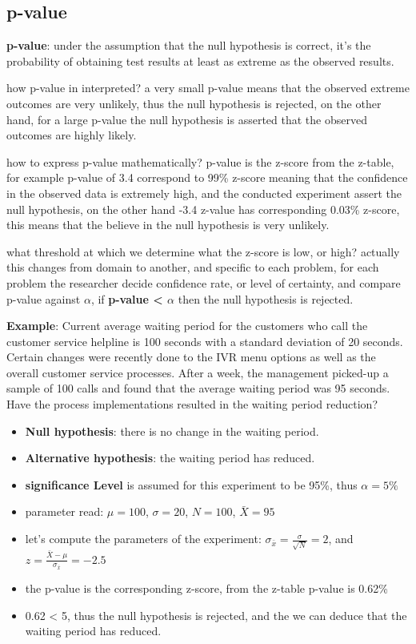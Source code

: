\documentclass[4apaper,12pt]{book}
\begin{document}
\begin{description}
\begin{description}
      \subsection{p-value}
    \item \textbf{p-value}: under the assumption that the null hypothesis is correct, it's the probability of obtaining test results at least as extreme as the observed results.
    \item how p-value in interpreted? a very small p-value means that the observed extreme outcomes are very unlikely, thus the null hypothesis is rejected, on the other hand, for a large p-value the null hypothesis is asserted that the observed outcomes are highly likely.
    \item how to express p-value mathematically? p-value is the z-score from the z-table, for example p-value of 3.4 correspond to 99\% z-score meaning that the confidence in the observed data is extremely high, and the conducted experiment assert the null hypothesis, on the other hand -3.4 z-value has corresponding 0.03\% z-score, this means that the believe in the null hypothesis is very unlikely.
    \item what threshold at which we determine what the z-score is low, or high? actually this changes from domain to another, and specific to each problem, for each problem the researcher decide confidence rate, or level of certainty, and compare p-value against $\alpha$, if \textbf{p-value < $\alpha$} then the null hypothesis is rejected.
    \item \textbf{Example}: Current average waiting period for the customers who call the customer service helpline is 100 seconds with a standard deviation of 20 seconds. Certain changes were recently done to the IVR menu options as well as the overall customer service processes. After a week, the management picked-up a sample of 100 calls and found that the average waiting period was 95 seconds. Have the process implementations resulted in the waiting period reduction?
      \begin{itemize}
      \item \textbf{Null hypothesis}: there is no change in the waiting period.
      \item \textbf{Alternative hypothesis}: the waiting period has reduced.
      \item \textbf{significance Level} is assumed for this experiment to be 95\%, thus $\alpha=5\%$
      \item parameter read: $\mu=100$, $\sigma=20$, $N=100$, $\bar{X}=95$
      \item let's compute the parameters of the experiment: $\sigma_{\bar{x}}=\frac{\sigma}{\sqrt{N}}=2$, and $z=\frac{\bar{X}-\mu}{\sigma_{\bar{x}}}=-2.5$
      \item the p-value is the corresponding z-score, from the z-table p-value is 0.62\%
        \item 0.62 < 5, thus the null hypothesis is rejected, and the we can deduce that the waiting period has reduced.
      \end{itemize}
    \end{description}
  \end{description}
\end{document}
